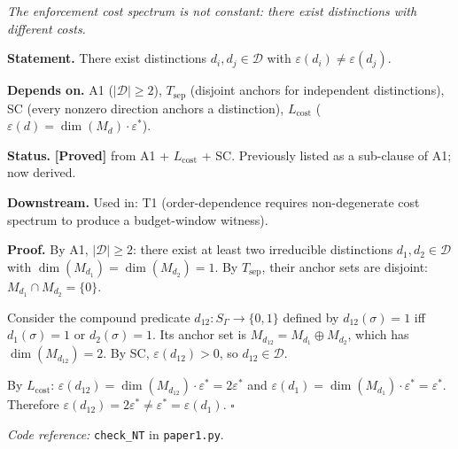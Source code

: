 \documentclass[11pt]{article}
\theoremstyle{remark}
\newcommand{\coderef}[2]{\smallskip\noindent\textit{Code reference:} \texttt{#1} in \texttt{#2}.}
\begin{document}
\begin{tcolorbox}[apfbox, title={Theorem NT (Non-Degeneracy) --- Proof}]
\textit{The enforcement cost spectrum is not constant: there exist distinctions with different costs.}

\smallskip\noindent\textbf{Statement.}  There exist distinctions $d_i, d_j \in \mathcal{D}$ with $\varepsilon(d_i) \ne \varepsilon(d_j)$.

\smallskip\noindent\textbf{Depends on.}  A1 ($|\mathcal{D}| \ge 2$), $T_{\mathrm{sep}}$ (disjoint anchors for independent distinctions), SC (every nonzero direction anchors a distinction), $L_{\mathrm{cost}}$ ($\varepsilon(d) = \dim(M_d) \cdot \varepsilon^*$).

\smallskip\noindent\textbf{Status.}  \textbf{[Proved]} from A1 + $L_{\mathrm{cost}}$ + SC.  Previously listed as a sub-clause of A1; now derived.

\smallskip\noindent\textbf{Downstream.}  Used in: T1 (order-dependence requires non-degenerate cost spectrum to produce a budget-window witness).

\smallskip\noindent\textbf{Proof.}  By A1, $|\mathcal{D}| \ge 2$: there exist at least two irreducible distinctions $d_1, d_2 \in \mathcal{D}$ with $\dim(M_{d_1}) = \dim(M_{d_2}) = 1$.  By $T_{\mathrm{sep}}$, their anchor sets are disjoint: $M_{d_1} \cap M_{d_2} = \{0\}$.

Consider the compound predicate $d_{12}: S_\Gamma \to \{0,1\}$ defined by $d_{12}(\sigma) = 1$ iff $d_1(\sigma) = 1$ or $d_2(\sigma) = 1$.  Its anchor set is $M_{d_{12}} = M_{d_1} \oplus M_{d_2}$, which has $\dim(M_{d_{12}}) = 2$.  By SC, $\varepsilon(d_{12}) > 0$, so $d_{12} \in \mathcal{D}$.

By $L_{\mathrm{cost}}$: $\varepsilon(d_{12}) = \dim(M_{d_{12}}) \cdot \varepsilon^* = 2\varepsilon^*$ and $\varepsilon(d_1) = \dim(M_{d_1}) \cdot \varepsilon^* = \varepsilon^*$.  Therefore $\varepsilon(d_{12}) = 2\varepsilon^* \ne \varepsilon^* = \varepsilon(d_1)$.  \hfill$\square$

\coderef{check\_NT}{paper1.py}
\end{tcolorbox}
\end{document}
